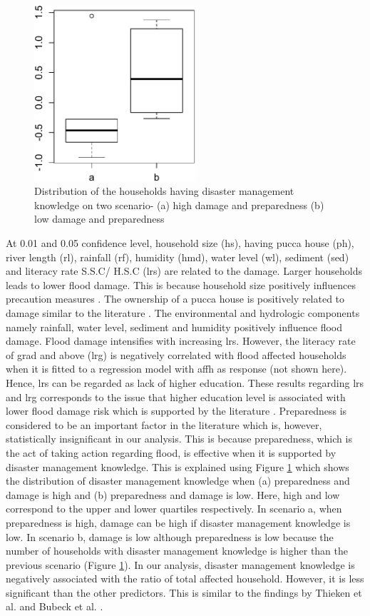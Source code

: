 \documentclass[preprint,review,12pt]{elsarticle}
\begin{document}
\begin{figure}[!ht]
  \centering
    \includegraphics[width=60mm, keepaspectratio]{boxplotprp.pdf}
    \caption{Distribution of the households having disaster management knowledge on two scenario- (a) high damage and preparedness (b) low damage and preparedness}
    \label{boxp}
\end{figure}
At 0.01 and 0.05 confidence level, household size (hs), having pucca house (ph), river length (rl), rainfall (rf), humidity (hmd), water level (wl), sediment (sed) and literacy rate S.S.C/ H.S.C (lrs) are related to the damage. Larger households leads to lower flood damage. This is because household size positively influences precaution measures \cite{thieken2007coping}. The ownership of a pucca house is positively related to damage similar to the literature \cite{zhai2005modeling,kreibich2005flood}. The environmental and hydrologic components namely rainfall, water level, sediment and humidity positively influence flood damage. Flood damage intensifies with increasing lrs. However, the literacy rate of grad and above (lrg) is negatively correlated with flood affected households when it is fitted to a regression model with affh as response (not shown here). Hence, lrs can be regarded as lack of higher education. These results regarding lrs and lrg corresponds to the issue that higher education level is associated with lower flood damage risk which is supported by the literature \cite{islam2012coping}. Preparedness is considered to be an important factor in the literature \cite{thieken2005flood,merz2013multi} which is, however, statistically insignificant in our analysis. This is because preparedness, which is the act of taking action regarding flood, is effective when it is supported by disaster management knowledge. This is explained using Figure \ref{boxp} which shows the distribution of disaster management knowledge when (a) preparedness and damage is high and (b) preparedness and damage is low. Here, high and low correspond to the upper and lower quartiles respectively. In scenario a, when preparedness is high, damage can be high if disaster management knowledge is low. In scenario b, damage is low although preparedness is low because the number of households with disaster management knowledge is higher than the previous scenario (Figure \ref{boxp}). In our analysis, disaster management knowledge is negatively associated with the ratio of total affected household. However, it is less significant than the other predictors. This is similar to the findings by Thieken et al. and Bubeck et al. \cite{thieken2005flood,bubeck2012long}.  
\end{document}
